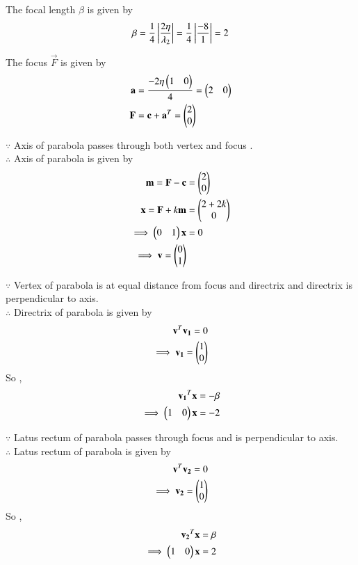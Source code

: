 \documentclass[journal,12pt,twocolumn]{IEEEtran}
\begin{document}
The focal length $\beta$ is given by
\begin{align}
\beta = \frac{1}{4}\left\vert\frac{2\eta}{\lambda_2}\right\vert = \frac{1}{4}\left\vert\frac{-8}{1}\right\vert= 2
\end{align}

The focus $\vec{F}$ is given by
\begin{align}
\mathbf{a} &= \frac{-2\eta\begin{pmatrix}1 & 0\end{pmatrix}}{4} = \begin{pmatrix}2 & 0\end{pmatrix}
\\
\mathbf{F} &= \mathbf{c} + \mathbf{a}^T = \begin{pmatrix}2\\0\end{pmatrix}
\end{align}

$\because$
Axis of parabola passes through both vertex and focus .
\\
$\therefore$
Axis of parabola is given by
\begin{align}
\mathbf{m} =\mathbf{F} - \mathbf{c} &= \begin{pmatrix}2\\0\end{pmatrix}
\\
\mathbf{x} = \mathbf{F} + k\mathbf{m} &= \begin{pmatrix}2+2k \\ 0\end{pmatrix}
\\
\implies \begin{pmatrix}0 & 1\end{pmatrix}\mathbf{x} &= 0
\\
\implies \mathbf{v} = \begin{pmatrix}0 \\ 1\end{pmatrix}
\end{align}

$\because$
Vertex of parabola is at equal distance from focus and directrix and directrix is perpendicular to axis.
\\
$\therefore$
Directrix of parabola is given by
\begin{align}
\mathbf{v}^T\mathbf{v_1} = 0
\\
\implies \mathbf{v_1} = \begin{pmatrix}1 \\ 0\end{pmatrix}
\end{align}
So , 
\begin{align}
\mathbf{v_1}^T\mathbf{x} = -\beta
\\
\implies \begin{pmatrix}1 & 0\end{pmatrix}\mathbf{x} = -2
\end{align}

$\because$
Latus rectum of parabola passes through focus and is perpendicular to axis.
\\
$\therefore$
Latus rectum of parabola is given by
\begin{align}
\mathbf{v}^T\mathbf{v_2} = 0
\\
\implies \mathbf{v_2} = \begin{pmatrix}1 \\ 0\end{pmatrix}
\end{align}
So , 
\begin{align}
\mathbf{v_2}^T\mathbf{x} = \beta
\\
\implies \begin{pmatrix}1 & 0\end{pmatrix}\mathbf{x} = 2
\end{align}
\end{document}
